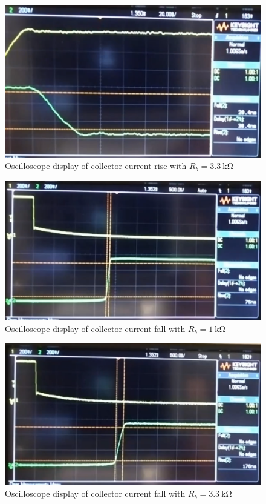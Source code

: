 \documentclass{article}
\begin{document}
\begin{figure}[H]
  \centering
  \includegraphics[width=\textwidth]{ECE2200L_3k3_rise.png}
  \caption{Oscilloscope display of collector current rise with $R_b = \SI{3.3}{\kilo\ohm}$}
  \label{fig:scope3k3rise}
\end{figure}
\begin{figure}[H]
  \centering
  \includegraphics[width=\textwidth]{ECE2200L_1k_fall.png}
  \caption{Oscilloscope display of collector current fall with $R_b = \SI{1}{\kilo\ohm}$}
  \label{fig:scope1kfall}
\end{figure}
\begin{figure}[H]
  \centering
  \includegraphics[width=\textwidth]{ECE2200L_3k3_fall.png}
  \caption{Oscilloscope display of collector current fall with $R_b = \SI{3.3}{\kilo\ohm}$}
  \label{fig:scope3k3fall}
\end{figure}
\end{document}
